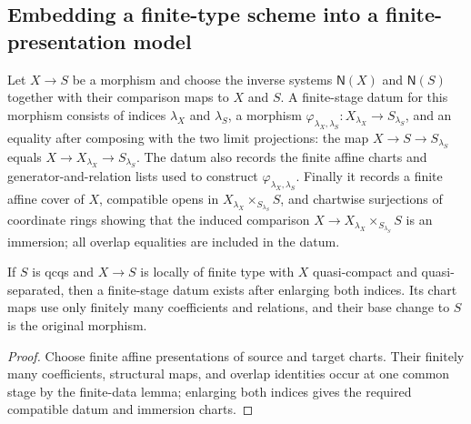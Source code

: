 \subsection{Embedding a finite-type scheme into a finite-presentation model}

\begin{definition}
  \label{def:nagata-relative-stage-morphism-data}

  Let $X\to S$ be a morphism and choose the inverse systems
  $\mathsf N(X)$ and $\mathsf N(S)$ together with their comparison maps to
  $X$ and $S$.  A finite-stage datum for this morphism consists of indices
  $\lambda_X$ and $\lambda_S$, a morphism
  $\varphi_{\lambda_X,\lambda_S}\colon X_{\lambda_X}\to S_{\lambda_S}$,
  and an equality after composing with the two limit projections: the map
  $X\to S\to S_{\lambda_S}$ equals
  $X\to X_{\lambda_X}\to S_{\lambda_S}$.  The datum also records the finite
  affine charts and generator-and-relation lists used to construct
  $\varphi_{\lambda_X,\lambda_S}$.  Finally it records a finite affine cover
  of $X$, compatible opens in
  $X_{\lambda_X}\times_{S_{\lambda_S}}S$, and chartwise surjections of
  coordinate rings showing that the induced comparison
  $X\to X_{\lambda_X}\times_{S_{\lambda_S}}S$ is an immersion; all overlap
  equalities are included in the datum.
\end{definition}

\begin{lemma}
  \label{lemma:nagata-relative-stage-morphism-data-exists}

  If $S$ is qcqs and $X\to S$ is locally of finite type with $X$
  quasi-compact and quasi-separated, then a finite-stage datum exists after enlarging both
  indices.  Its chart maps use only finitely many coefficients and relations,
  and their base change to $S$ is the original morphism.
\end{lemma}

\begin{proof}
  Choose finite affine presentations of source and target charts. Their
  finitely many coefficients, structural maps, and overlap identities occur
  at one common stage by the finite-data lemma; enlarging both indices gives
  the required compatible datum and immersion charts.
\end{proof}

